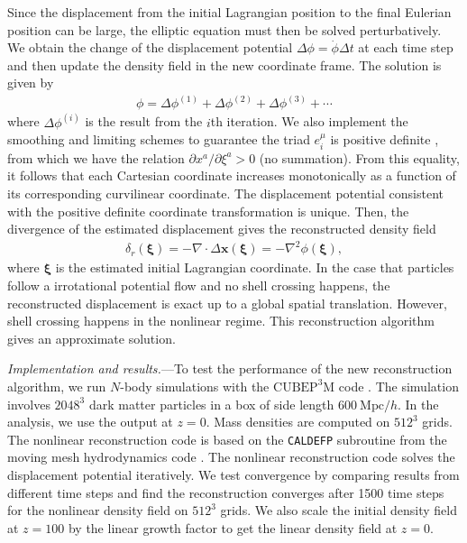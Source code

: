 \documentclass[aps,prl,twocolumn,showpacs,superscriptaddress,groupedaddress,nofootinbib]{revtex4}  %
\newcommand{\mr}{\mathrm}
\newcommand{\bea}{\begin{eqnarray}}
\newcommand{\eea}{\end{eqnarray}}
\begin{document}
Since the displacement from the initial Lagrangian position to the final 
Eulerian position can be large, the elliptic equation must then be solved 
perturbatively. We obtain the change of the displacement potential 
$\Delta\phi=\dot{\phi}\Delta t$ at each time step and then update the density
field in the new coordinate frame.  
The solution is given by 
\bea
\phi=\Delta\phi^{(1)}+\Delta\phi^{(2)}+\Delta\phi^{(3)}+\cdots
\eea
where $\Delta\phi^{(i)}$ is the result from the $i$th iteration. 
We also implement the smoothing and limiting schemes to guarantee the triad 
$e^\mu_i$ is positive definite \cite{1995ApJS..100..269P,1998ApJS..115...19P},
from which we have the relation $\partial x^a/\partial\xi^a>0$ (no summation).
From this equality, it follows that each Cartesian coordinate increases monotonically as a function of its corresponding curvilinear coordinate.
The displacement potential consistent with the
positive definite coordinate transformation is unique.
Then, the divergence of the estimated displacement gives the 
reconstructed density field 
\bea
\delta_r(\bm{\xi})=-\nabla\cdot\Delta\bm{x}(\bm{\xi})
=-\nabla^2\phi(\bm{\xi}),
\eea
where $\bm{\xi}$ is the estimated initial Lagrangian coordinate.
In the case that particles follow a irrotational potential flow and no shell
crossing happens, the reconstructed displacement is exact up to a global 
spatial translation.
However, shell crossing happens in the nonlinear regime. This reconstruction
algorithm gives an approximate solution.


{\it Implementation and results.}---To test the performance of 
the new reconstruction algorithm, we run $N$-body simulations with 
the $\mr{CUBEP}^3\mr{M}$ code \cite{2013code}.
The simulation involves $2048^3$ dark matter particles in a box of 
side length $600\ \mr{Mpc}/h$.
In the analysis, we use the output at $z=0$. Mass densities are computed
on $512^3$ grids. 
The nonlinear reconstruction code is based on the {\tt CALDEFP} subroutine from 
the moving mesh hydrodynamics code \cite{1998ApJS..115...19P}.
The nonlinear reconstruction code solves the displacement potential iteratively.
We test convergence by comparing results from different time steps and 
find the reconstruction converges after 1500 time steps for the nonlinear 
density field on $512^3$ grids.
We also scale the initial density field at $z=100$ by the linear growth factor
to get the linear density field at $z=0$.
\end{document}
